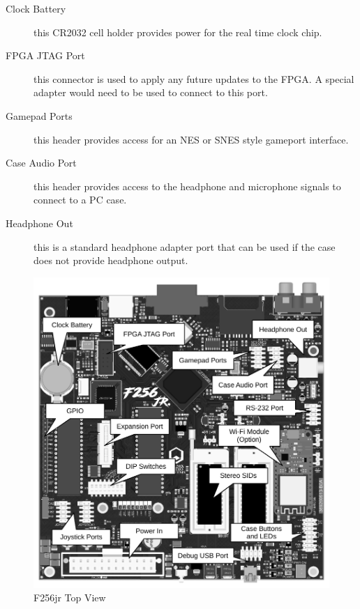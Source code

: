 \begin{description}
    \item[Clock Battery] this CR2032 cell holder provides power for the real time clock chip.

    \item[FPGA JTAG Port] this connector is used to apply any future updates to the FPGA. A special adapter would need to be used to connect to this port.

    \item[Gamepad Ports] this header provides access for an NES or SNES style gameport interface.

    \item[Case Audio Port] this header provides access to the headphone and microphone signals to connect to a PC case.

    \item[Headphone Out] this is a standard headphone adapter port that can be used if the case does not provide headphone output.
\end{description}

\begin{figure}[ht]
    \begin{center}
        \includegraphics[scale=0.55]{images/f256_render_annotated_top.pdf}
    \end{center}
    \caption{F256jr Top View}
    \label{fig:top}
\end{figure}

